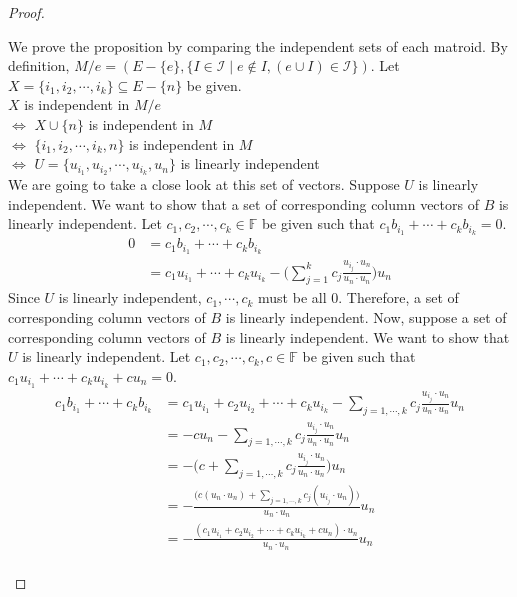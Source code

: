 \begin{proof}
\begin{enumerate}
  We prove the proposition by comparing the independent sets of each matroid.
  By definition, $M / e = (E - \{ e \}, \{ I \in \mathcal{I} \mid e \notin I, (e \cup I) \in \mathcal{I}\})$.
  Let $X = \{ i_1, i_2, \cdots, i_k \} \subseteq E - \{ n \}$ be given. \\
  $X$ is independent in $M / e$ \\
  $\iff$ $X \cup \{ n \}$ is independent in $M$ \\
  $\iff$ $\{ i_1, i_2, \cdots, i_k, n \}$ is independent in $M$ \\
  $\iff$ $U = \{ u_{i_1}, u_{i_2}, \cdots, u_{i_k}, u_{n} \}$ is linearly independent \\
  We are going to take a close look at this set of vectors.
  Suppose $U$ is linearly independent.
  We want to show that a set of corresponding column vectors of $B$ is linearly independent.
  Let $c_1, c_2, \cdots, c_k \in \mathbb{F}$ be given such that $c_1 b_{i_1} + \cdots + c_k b_{i_k} = 0$.\\
  \begin{align*}\displaystyle 
  0 &= c_1 b_{i_1} + \cdots + c_k b_{i_k}  \\
    &= c_1 u_{i_1} + \cdots + c_k u_{i_k} - \Big( \sum_{j = 1}^{k} c_j \frac{u_{i_j} \cdot u_n}{u_n \cdot u_n} \Big) u_n
  \end{align*}
  Since $U$ is linearly independent, $c_1, \cdots, c_k$ must be all 0.
  Therefore, a set of corresponding column vectors of $B$ is linearly independent.
  Now, suppose a set of corresponding column vectors of $B$ is linearly independent.
  We want to show that $U$ is linearly independent.
  Let $c_1, c_2, \cdots, c_k, c \in \mathbb{F}$ be given such that $c_1 u_{i_1} + \cdots + c_k u_{i_k} + c u_n = 0$.\\
  \begin{align*}\displaystyle
  c_1 b_{i_1} + \cdots + c_k b_{i_k}
  &= c_1 u_{i_1} + c_2 u_{i_2} + \cdots + c_k u_{i_k} - \sum_{j=1,\cdots,k} c_j \frac{u_{i_j} \cdot u_n}{u_n \cdot u_n} u_n  \\
  &= -c u_n - \sum_{j=1,\cdots,k} c_j \frac{u_{i_j} \cdot u_n}{u_n \cdot u_n} u_n \\
  &= -\Big(c + \sum_{j=1,\cdots,k} c_j \frac{u_{i_j} \cdot u_n}{u_n \cdot u_n}\Big)u_n \\
  &= -\frac{\Big(c({u_n \cdot u_n}) + \sum_{j=1,\cdots,k} c_j (u_{i_j} \cdot u_n)\Big)}{u_n \cdot u_n}u_n \\
  &= -\frac{(c_1 u_{i_1} + c_2 u_{i_2} + \cdots + c_k u_{i_k} + c u_n) \cdot u_n}{u_n \cdot u_n}u_n \\

\end{align*}
\end{enumerate}
\end{proof}
